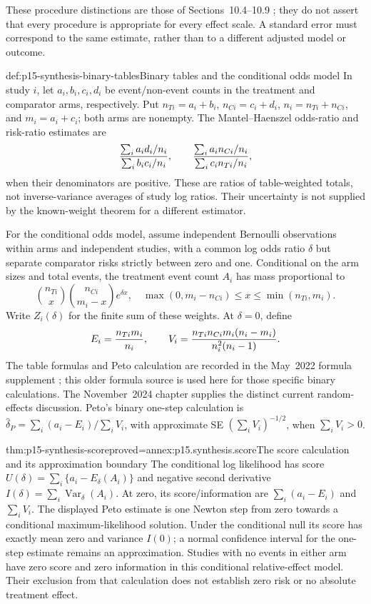 These procedure distinctions are those of Sections~10.4--10.9
\cite{DeeksEtAl2024Cochrane10}; they do not assert that every procedure is
appropriate for every effect scale. A standard error must correspond to the
same estimate, rather than to a different adjusted model or outcome.

\begin{hbdefinition}{def:p15-synthesis-binary-tables}{Binary tables and the conditional odds model}
In study \(i\), let \(a_i,b_i,c_i,d_i\) be event/non-event counts
in the treatment and comparator arms, respectively. Put
\(n_{Ti}=a_i+b_i\), \(n_{Ci}=c_i+d_i\),
\(n_i=n_{Ti}+n_{Ci}\), and \(m_i=a_i+c_i\); both arms are nonempty.
The Mantel--Haenszel odds-ratio and risk-ratio estimates are
\[
 {\sum_i a_id_i/n_i\over\sum_i b_ic_i/n_i},\qquad
 {\sum_i a_in_{Ci}/n_i\over\sum_i c_in_{Ti}/n_i},
\]
when their denominators are positive. These are ratios of table-weighted
totals, not inverse-variance averages of study log ratios. Their uncertainty
is not supplied by the known-weight theorem for a different estimator.

For the conditional odds model, assume independent Bernoulli observations
within arms and independent studies, with a common log odds ratio \(\delta\)
but separate comparator risks strictly between zero and one. Conditional on the arm sizes and total events,
the treatment event count \(A_i\) has mass proportional to
\[
 {n_{Ti}\choose x}{n_{Ci}\choose m_i-x}e^{\delta x},
 \quad \max(0,m_i-n_{Ci})\leq x\leq\min(n_{Ti},m_i).
\]
Write \(Z_i(\delta)\) for the finite sum of these weights. At
\(\delta=0\), define
\[
 E_i={n_{Ti}m_i\over n_i},\qquad
 V_i={n_{Ti}n_{Ci}m_i(n_i-m_i)\over n_i^2(n_i-1)}.
\]
The table formulas and Peto calculation are recorded in the May~2022
formula supplement \cite[pp.~2, 4--5, 7]{DeeksHiggins2022RevMan}; this older
formula source is used here for those specific binary calculations. The
November~2024 chapter supplies the distinct current random-effects discussion.
Peto's binary one-step calculation is
\(\widehat\delta_P=\sum_i(a_i-E_i)/\sum_iV_i\), with approximate
SE \((\sum_iV_i)^{-1/2}\), when \(\sum_iV_i>0\).
\end{hbdefinition}

\begin{hbtheorem}{thm:p15-synthesis-score}{proved=annex:p15.synthesis.score}{The score calculation and its approximation boundary}
The conditional log likelihood has score
\(U(\delta)=\sum_i\{a_i-E_\delta(A_i)\}\) and negative second
derivative \(I(\delta)=\sum_i\operatorname{Var}_\delta(A_i)\).
At zero, its score/information are \(\sum_i(a_i-E_i)\) and
\(\sum_iV_i\). The displayed Peto estimate is one Newton step from
zero towards a conditional maximum-likelihood solution. Under the conditional
null its score has exactly mean zero and variance \(I(0)\); a normal
confidence interval for the one-step estimate remains an approximation.
Studies with no events in either arm have zero score and zero information
in this conditional relative-effect model. Their exclusion from that
calculation does not establish zero risk or no absolute treatment effect.
\end{hbtheorem}

